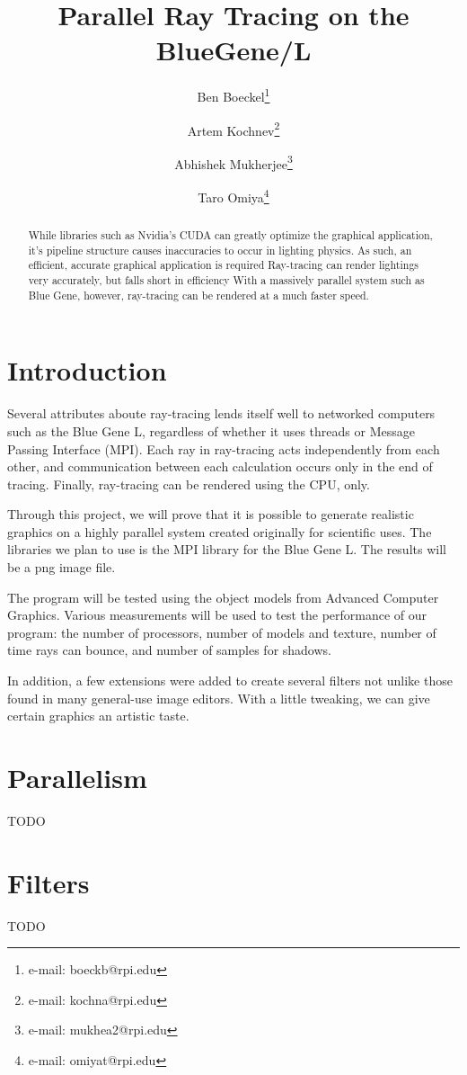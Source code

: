 \documentclass{acmsiggraph}
\title{Parallel Ray Tracing on the BlueGene/L}
\author{%
Ben Boeckel\thanks{e-mail: boeckb@rpi.edu} %
\and Artem Kochnev\thanks{e-mail: kochna@rpi.edu} %
\and Abhishek Mukherjee\thanks{e-mail: mukhea2@rpi.edu} %
\and Taro Omiya\thanks{e-mail: omiyat@rpi.edu}}
\begin{document}
\maketitle

\begin{abstract}
While libraries such as Nvidia's CUDA can greatly optimize the graphical
application, it's pipeline structure causes inaccuracies to occur in lighting
physics.  As such, an efficient, accurate graphical application is required
Ray-tracing can render lightings very accurately, but falls short in efficiency
With a massively parallel system such as Blue Gene, however, ray-tracing can be
rendered at a much faster speed.
\end{abstract}
\keywordlist

\section{Introduction}
Several attributes aboute ray-tracing lends itself well to networked computers
such as the Blue Gene L, regardless of whether it uses threads or Message
Passing Interface (MPI).  Each ray in ray-tracing acts independently from each
other, and communication between each calculation occurs only in the end of
tracing.  Finally, ray-tracing can be rendered using the CPU, only.

Through this project, we will prove that it is possible to generate realistic
graphics on a highly parallel system created originally for scientific uses.
The libraries we plan to use is the MPI library for the Blue Gene L.
The results will be a png image file.

The program will be tested using the object models from Advanced Computer
Graphics.  Various measurements will be used to test the performance of our
program: the number of processors, number of models and texture, number of time
rays can bounce, and number of samples for shadows.

In addition, a few extensions were added to create several filters not unlike
those found in many general-use image editors. With a little tweaking, we
can give certain graphics an artistic taste.

\section{Parallelism}
TODO

\section{Filters}
TODO
\end{document}
